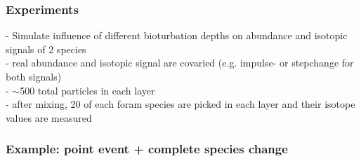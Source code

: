 \documentclass{beamer}
\begin{document}
\begin{frame}
\frametitle{Experiments}
- Simulate influence of different bioturbation depths on abundance and isotopic signals of 2 species\\[1.5ex]
- real abundance and isotopic signal are covaried (e.g. impulse- or stepchange for both signals)\\[1.5ex]
- $\sim$500 total particles in each layer\\[1.5ex]
- after mixing, 20 of each foram species are picked in each layer and their isotope values are measured
\end{frame}

\begin{frame}
\frametitle{Example: point event + complete species change}
  \begin{figure}
  \begin{center}
\end{center}
\end{figure}
\end{frame}
\end{document}
